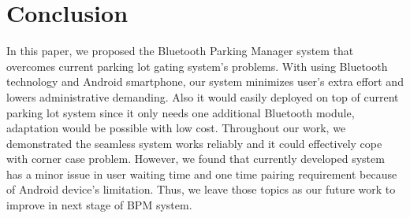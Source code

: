 \section{Conclusion}

In this paper, we proposed the Bluetooth Parking Manager system that overcomes current parking lot gating system's problems. With using Bluetooth technology and Android smartphone, our system minimizes user's extra effort and lowers administrative demanding.  Also it would easily deployed on top of current parking lot system since it only needs one additional Bluetooth module, adaptation would be possible with low cost. Throughout our work, we demonstrated the seamless system works reliably and it could effectively cope with corner case problem. However, we found that currently developed system has a minor issue in user waiting time and one time pairing requirement because of Android device's limitation. Thus, we leave those topics as our future work to improve in next stage of BPM system.